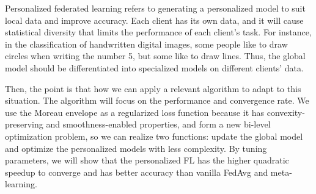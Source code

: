 \documentclass{article}
\begin{document}
Personalized federated learning refers to generating a personalized model to suit local data and improve accuracy. Each client has its own data, and it will cause statistical diversity that limits the performance of each client’s task. For instance, in the classification of handwritten digital images, some people like to draw circles when writing the number 5, but some like to draw lines. Thus, the global model should be differentiated into specialized models on different clients’ data. 
 
Then, the point is that how we can apply a relevant algorithm to adapt to this situation. The algorithm will focus on the performance and convergence rate. We use the Moreau envelope as a regularized loss function because it has convexity-preserving and smoothness-enabled properties, and form a new bi-level optimization problem, so we can realize two functions: update the global model and optimize the personalized models with less complexity. By tuning parameters, we will show that the personalized FL has the higher quadratic speedup to converge and has better accuracy than vanilla FedAvg and meta-learning. 
\end{document}
